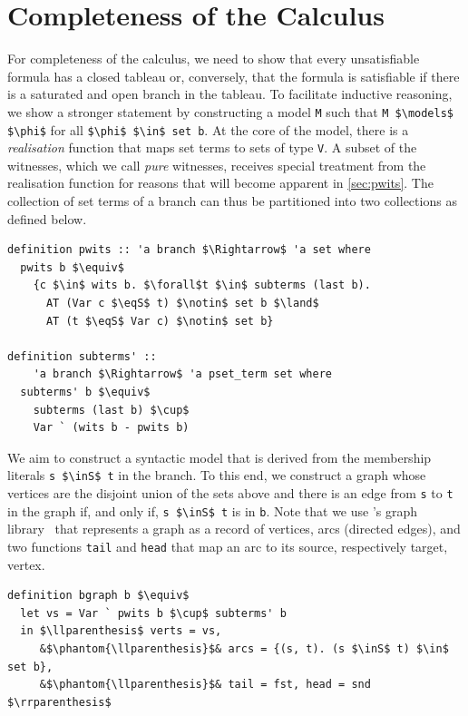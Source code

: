 \documentclass[
  sigplan,
  10pt,
  ]{acmart}
\newcommand{\inS}{\in_\text{s}}
\newcommand{\eqS}{=_\text{s}}
\begin{document}
\section{Completeness of the Calculus\label{sec:complete}}
For completeness of the calculus, we need to show that every unsatisfiable formula has a closed tableau or, conversely, that the formula is satisfiable if there is a saturated and open branch in the tableau.
To facilitate inductive reasoning, we show a stronger statement by constructing a model \lstinline!M! such that \lstinline!M $\models$ $\phi$! for all \lstinline!$\phi$ $\in$ set b!.
At the core of the model, there is a \textit{realisation} function that maps set terms to sets of type \lstinline!V!.
A subset of the witnesses, which we call \textit{pure} witnesses, receives special treatment from the realisation function for reasons that will become apparent in \autoref{sec:pwits}.
The collection of set terms of a branch can thus be partitioned into two collections as defined below.
\begin{lstlisting}
definition pwits :: 'a branch $\Rightarrow$ 'a set where
  pwits b $\equiv$
    {c $\in$ wits b. $\forall$t $\in$ subterms (last b).
      AT (Var c $\eqS$ t) $\notin$ set b $\land$
      AT (t $\eqS$ Var c) $\notin$ set b} 

definition subterms' ::
    'a branch $\Rightarrow$ 'a pset_term set where
  subterms' b $\equiv$
    subterms (last b) $\cup$ 
    Var ` (wits b - pwits b)
\end{lstlisting}

We aim to construct a syntactic model that is derived from the membership literals \lstinline!s $\inS$ t! in the branch.
To this end, we construct a graph whose vertices are the disjoint union of the sets above and there is an edge from \lstinline!s! to \lstinline!t! in the graph if, and only if, \lstinline!s $\inS$ t! is in \lstinline!b!.
Note that we use \citeauthor{graph_theory_afp}'s graph library~\cite{graph_theory_afp} that represents a graph as a record of vertices, arcs (directed edges), and two functions \lstinline!tail! and \lstinline!head! that map an arc to its source, respectively target, vertex.
\begin{lstlisting}
definition bgraph b $\equiv$
  let vs = Var ` pwits b $\cup$ subterms' b
  in $\llparenthesis$ verts = vs,
     &$\phantom{\llparenthesis}$& arcs = {(s, t). (s $\inS$ t) $\in$ set b},
     &$\phantom{\llparenthesis}$& tail = fst, head = snd $\rrparenthesis$
\end{lstlisting}
\end{document}
